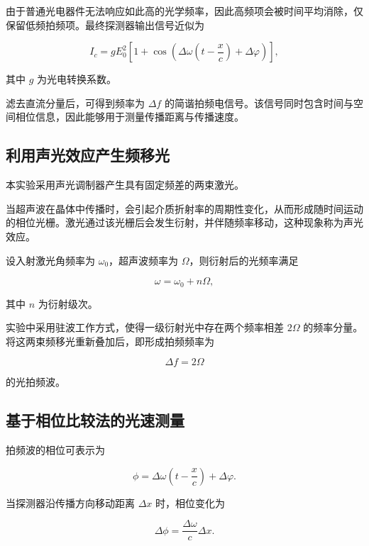 \documentclass[a4paper]{ctexart}
\begin{document}
由于普通光电器件无法响应如此高的光学频率，因此高频项会被时间平均消除，仅保留低频拍频项。最终探测器输出信号近似为

\begin{equation}
I_c
=
gE_0^2
\left[
1+
\cos
\left(
\Delta\omega
\left(t-\frac{x}{c}\right)
+\Delta\varphi
\right)
\right],
\end{equation}

其中 $g$ 为光电转换系数。

滤去直流分量后，可得到频率为 $\Delta f$ 的简谐拍频电信号。该信号同时包含时间与空间相位信息，因此能够用于测量传播距离与传播速度。


\subsection{利用声光效应产生频移光}

本实验采用声光调制器产生具有固定频差的两束激光。

当超声波在晶体中传播时，会引起介质折射率的周期性变化，从而形成随时间运动的相位光栅。激光通过该光栅后会发生衍射，并伴随频率移动，这种现象称为声光效应。

设入射激光角频率为 $\omega_0$，超声波频率为 $\Omega$，则衍射后的光频率满足

\begin{equation}
    \omega = \omega_0 + n\Omega,
\end{equation}

其中 $n$ 为衍射级次。

实验中采用驻波工作方式，使得一级衍射光中存在两个频率相差 $2\Omega$ 的频率分量。将这两束频移光重新叠加后，即形成拍频频率为

\begin{equation}
    \Delta f = 2\Omega
\end{equation}

的光拍频波。


\subsection{基于相位比较法的光速测量}

拍频波的相位可表示为

\begin{equation}
    \phi
    =
    \Delta\omega
    \left(
    t-\frac{x}{c}
    \right)
    +\Delta\varphi.
\end{equation}

当探测器沿传播方向移动距离 $\Delta x$ 时，相位变化为

\begin{equation}
    \Delta\phi
    =
    \frac{\Delta\omega}{c}\Delta x.
\end{equation}
\end{document}
